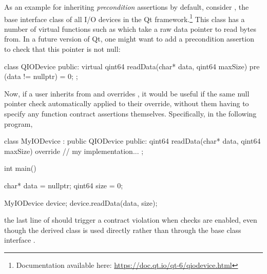 As an example for inheriting \emph{precondition} assertions by default, consider , the base interface class of all I/O devices in the Qt framework.\footnote{Documentation available here: \url{https://doc.qt.io/qt-6/qiodevice.html}} This class has a number of virtual functions such as  which take a raw data pointer to read bytes from. In a future version of Qt, one might want to add a precondition assertion to check that this pointer is not null:
\begin{codeblock}
class QIODevice {
public:
  virtual qint64 readData(char* data, qint64 maxSize)
    pre (data != nullptr) = 0;
};
\end{codeblock}
Now, if a user inherits from  and overrides , it would be useful if the same null pointer check automatically applied to their override, without them having to specify any function contract assertions themselves. Specifically, in the following program,
\begin{codeblock}
class MyIODevice : public QIODevice {
public:
  qint64 readData(char* data, qint64 maxSize) override {
    // my implementation...
  }
};

int main() {
  char* data = nullptr;
  qint64 size = 0;
  
  MyIODevice device;
  device.readData(data, size);
}
\end{codeblock}
the last line of  should trigger a contract violation when checks are enabled, even though the derived class  is used directly rather than through the base class interface . 

